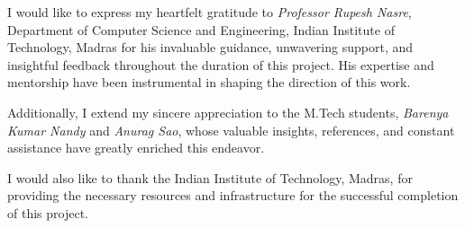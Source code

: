 I would like to express my heartfelt gratitude to \emph{Professor Rupesh Nasre}, Department of Computer Science and Engineering, Indian Institute of Technology, Madras for his invaluable guidance,
 unwavering support, and insightful feedback throughout the duration of this project. 
 His expertise and mentorship have been instrumental in shaping the direction of this work.

\vspace {1em}

 Additionally, I extend my sincere appreciation to the M.Tech students, \emph{Barenya Kumar Nandy} and \emph{Anurag Sao}, whose valuable insights, 
 references, and constant assistance have greatly enriched this endeavor.

\vspace {1em}

I would also like to thank the Indian Institute of Technology, Madras, for providing the necessary resources and infrastructure for the successful completion of this project.
